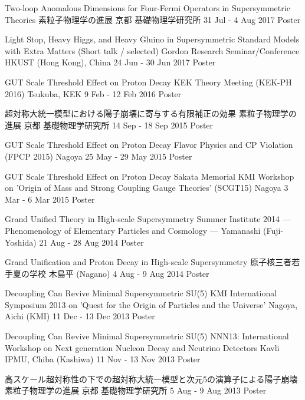 \begin{talklist}

\talkentry
  {Two-loop Anomalous Dimensions for Four-Fermi Operators in Supersymmetric Theories}
  {素粒子物理学の進展}
  {京都 基礎物理学研究所}
  {31 Jul - 4 Aug 2017}
  {Poster}

\talkentry
  {Light Stop, Heavy Higgs, and Heavy Gluino in Supersymmetric Standard Models with Extra Matters (Short talk / selected)}
  {Gordon Research Seminar/Conference}
  {HKUST (Hong Kong), China}
  {24 Jun - 30 Jun 2017}
  {Poster}

\talkentry
  {GUT Scale Threshold Effect on Proton Decay}
  {KEK Theory Meeting (KEK-PH 2016)}
  {Tsukuba, KEK}
  {9 Feb - 12 Feb 2016}
  {Poster}

\talkentry
  {超対称大統一模型における陽子崩壊に寄与する有限補正の効果}
  {素粒子物理学の進展}
  {京都 基礎物理学研究所}
  {14 Sep - 18 Sep 2015}
  {Poster}

\talkentry
  {GUT Scale Threshold Effect on Proton Decay}
  {Flavor Physics and CP Violation (FPCP 2015)}
  {Nagoya}
  {25 May - 29 May 2015}
  {Poster}

\talkentry
  {GUT Scale Threshold Effect on Proton Decay}
  {Sakata Memorial KMI Workshop on 'Origin of Mass and Strong Coupling Gauge Theories' (SCGT15)}
  {Nagoya}
  {3 Mar - 6 Mar 2015}
  {Poster}

\talkentry
  {Grand Unified Theory in High-scale Supersymmetry}
  {Summer Institute 2014 --- Phenomenology of Elementary Particles and Cosmology ---}
  {Yamanashi (Fuji-Yoshida)}
  {21 Aug - 28 Aug 2014}
  {Poster}

\talkentry
  {Grand Unification and Proton Decay in High-scale Supersymmetry}
  {原子核三者若手夏の学校}
  {木島平 (Nagano)}
  {4 Aug - 9 Aug 2014}
  {Poster}

\talkentry
  {Decoupling Can Revive Minimal Supersymmetric SU(5)}
  {KMI International Symposium 2013 on 'Quest for the Origin of Particles and the Universe'}
  {Nagoya, Aichi (KMI)}
  {11 Dec - 13 Dec 2013}
  {Poster}

\talkentry
  {Decoupling Can Revive Minimal Supersymmetric SU(5)}
  {NNN13: International Workshop on Next generation Nucleon Decay and Neutrino Detectors}
  {Kavli IPMU, Chiba (Kashiwa)}
  {11 Nov - 13 Nov 2013}
  {Poster}

\talkentry
  {高スケール超対称性の下での超対称大統一模型と次元5の演算子による陽子崩壊}
  {素粒子物理学の進展}
  {京都 基礎物理学研究所}
  {5 Aug - 9 Aug 2013}
  {Poster}

\end{talklist}
